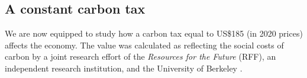 \subsection{A constant carbon tax}\label{subsec:exp}


We are now equipped to study how a carbon tax  equal to US\$185 (in 2020 prices) affects the economy. The value was calculated as reflecting the social costs of carbon by a joint research effort of the \textit{Resources for the Future} (RFF), an independent research institution, and the University of Berkeley \citep{Rennert2022ComprehensiveCO2}. 
% 



